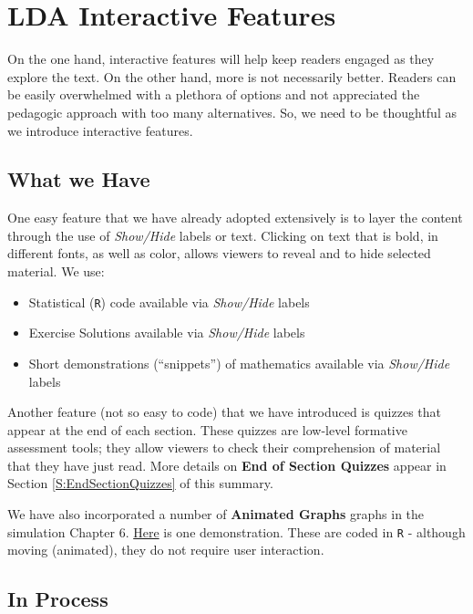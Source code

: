 \documentclass[
]{book}
\providecommand{\tightlist}{%
  \setlength{\itemsep}{0pt}\setlength{\parskip}{0pt}}
\begin{document}
\hypertarget{S:Features}{%
\section{LDA Interactive Features}\label{S:Features}}

On the one hand, interactive features will help keep readers engaged as they explore the text. On the other hand, more is not necessarily better. Readers can be easily overwhelmed with a plethora of options and not appreciated the pedagogic approach with too many alternatives. So, we need to be thoughtful as we introduce interactive features.

\hypertarget{what-we-have}{%
\subsection{What we Have}\label{what-we-have}}

One easy feature that we have already adopted extensively is to layer the content through the use of \emph{Show/Hide} labels or text. Clicking on text that is bold, in different fonts, as well as color, allows viewers to reveal and to hide selected material. We use:

\begin{itemize}
\tightlist
\item
  Statistical (\texttt{R}) code available via \emph{Show/Hide} labels
\item
  Exercise Solutions available via \emph{Show/Hide} labels
\item
  Short demonstrations (``snippets'') of mathematics available via \emph{Show/Hide} labels
\end{itemize}

Another feature (not so easy to code) that we have introduced is quizzes that appear at the end of each section. These quizzes are low-level formative assessment tools; they allow viewers to check their comprehension of material that they have just read. More details on \textbf{End of Section Quizzes} appear in Section \ref{S:EndSectionQuizzes} of this summary.

We have also incorporated a number of \textbf{Animated Graphs} graphs in the simulation Chapter 6. \href{https://openacttexts.github.io/Loss-Data-Analytics/C-Simulation.html\#S:ImportanceSampling}{Here} is one demonstration. These are coded in \texttt{R} - although moving (animated), they do not require user interaction.

\hypertarget{in-process}{%
\subsection{In Process}\label{in-process}}
\end{document}
